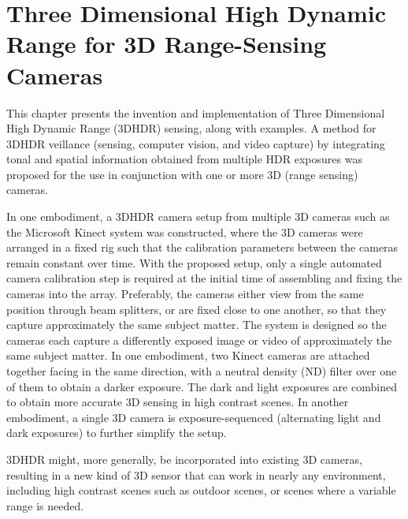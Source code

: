 \chapter{Three Dimensional High Dynamic Range for 3D Range-Sensing Cameras}
\label{3dhdr3dsensing}

This chapter presents the invention and implementation of Three Dimensional High Dynamic Range (3DHDR) sensing, along with examples. A method for 3DHDR veillance (sensing, computer vision, and video capture) by integrating tonal and spatial information obtained from multiple HDR exposures was proposed for the use in conjunction with one or more 3D (range sensing) cameras.

In one embodiment, a 3DHDR camera setup from multiple 3D cameras such as the Microsoft Kinect system was constructed, where the 3D cameras were arranged in a fixed rig such that the calibration parameters between the cameras remain constant over time. With the proposed setup, only a single automated camera calibration step is required at the initial time of assembling and fixing the cameras into the array.  Preferably, the cameras either view from the same position through beam splitters, or are fixed close to one another, so that they capture approximately the same subject matter. The system is designed so the cameras each capture a differently exposed image or video of approximately the same subject matter.  In one embodiment, two Kinect cameras are attached together facing in the same direction, with a neutral density (ND) filter over one of them to obtain a darker exposure.  The dark and light exposures are combined to obtain more accurate 3D sensing in high contrast scenes.  In another embodiment, a single 3D camera is exposure-sequenced (alternating light and dark exposures) to further simplify the setup.

3DHDR might, more generally, be incorporated into existing 3D cameras, resulting in a new kind of 3D sensor that can work in nearly any environment, including high contrast scenes such as outdoor scenes, or scenes where a variable range is needed.


